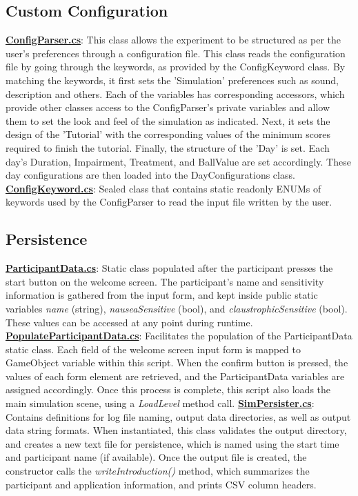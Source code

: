 \documentclass{article}
\begin{document}
\subsection{Custom Configuration} 
\href{https://bit.ly/2TZaLYj}{\textbf{ConfigParser.cs}}: This class allows the experiment to be structured as per the user's preferences through a configuration file. This class reads the configuration file by going through the keywords, as provided by the ConfigKeyword class. By matching the keywords, it first sets the 'Simulation' preferences such as sound, description and others. Each of the variables has corresponding accessors, which provide other classes access to the ConfigParser's private variables and allow them to set the look and feel of the simulation as indicated. Next, it sets the design of the 'Tutorial' with the corresponding values of the minimum scores required to finish the tutorial. Finally, the structure of the 'Day' is set. Each day's Duration, Impairment, Treatment, and BallValue are set accordingly. These day configurations are then loaded into the DayConfigurations class.
\href{https://bit.ly/2TWgOwJ}{\textbf{ConfigKeyword.cs}}: Sealed class that contains static readonly ENUMs of keywords used by the ConfigParser to read the input file written by the user. 



\subsection{Persistence} %
\href{https://bit.ly/2Fhq8B2}{\textbf{ParticipantData.cs}}: Static class populated after the participant presses the start button on the welcome screen. The participant's name and sensitivity information is gathered from the input form, and kept inside public static variables \textit{name} (string), \textit{nauseaSensitive} (bool), and \textit{claustrophicSensitive} (bool). These values can be accessed at any point during runtime. \newline \newline
\href{https://bit.ly/2WgL6qR}{\textbf{PopulateParticipantData.cs}}: Facilitates the population of the ParticipantData static class. Each field of the welcome screen input form is mapped to GameObject variable within this script. When the confirm button is pressed, the values of each form element are retrieved, and the ParticipantData variables are assigned accordingly. Once this process is complete, this script also loads the main simulation scene, using a \textit{LoadLevel} method call. \newline \newline
\href{https://bit.ly/2OdbwH6}{\textbf{SimPersister.cs}}: Contains definitions for log file naming, output data directories, as well as output data string formats. When instantiated, this class validates the output directory, and creates a new text file for persistence, which is named using the start time and participant name (if available). Once the output file is created, the constructor calls the \textit{writeIntroduction()} method, which summarizes the participant and application information, and prints CSV column headers.
\end{document}
